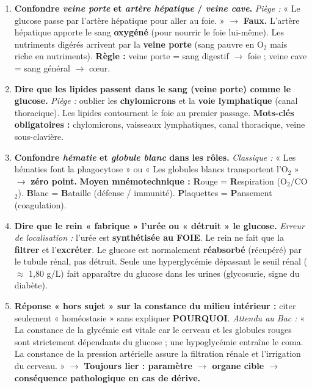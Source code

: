 \documentclass[11pt]{article}
\begin{document}
\begin{attention}
    \begin{enumerate}
        \item \textbf{Confondre \emph{veine porte} et \emph{artère hépatique} / \emph{veine cave}.}
            \emph{Piège :} « Le glucose passe par l'artère hépatique pour aller au foie. » $\rightarrow$ \textbf{Faux.} L'artère hépatique apporte le sang \textbf{oxygéné} (pour nourrir le foie lui-même). Les nutriments digérés arrivent par la \textbf{veine porte} (sang pauvre en O$_2$ mais riche en nutriments). \textbf{Règle :} veine porte = sang digestif $\rightarrow$ foie ; veine cave = sang général $\rightarrow$ cœur.
        \item \textbf{Dire que les lipides passent dans le sang (veine porte) comme le glucose.}
            \emph{Piège :} oublier les \textbf{chylomicrons} et la \textbf{voie lymphatique} (canal thoracique). Les lipides contournent le foie au premier passage. \textbf{Mots-clés obligatoires :} chylomicrons, vaisseaux lymphatiques, canal thoracique, veine sous-clavière.
        \item \textbf{Confondre \emph{hématie} et \emph{globule blanc} dans les rôles.}
            \emph{Classique :} « Les hématies font la phagocytose » ou « Les globules blancs transportent l'O$_2$ » $\rightarrow$ \textbf{zéro point.} \textbf{Moyen mnémotechnique :} \textbf{R}ouge = \textbf{R}espiration (O$_2$/CO$_2$). \textbf{B}lanc = \textbf{B}ataille (défense / immunité). \textbf{P}laquettes = \textbf{P}ansement (coagulation).
        \item \textbf{Dire que le rein « fabrique » l'urée ou « détruit » le glucose.}
            \emph{Erreur de localisation :} l'urée est \textbf{synthétisée au FOIE}. Le rein ne fait que la \textbf{filtrer} et l'\textbf{excréter}. Le glucose est normalement \textbf{réabsorbé} (récupéré) par le tubule rénal, pas détruit. Seule une hyperglycémie dépassant le seuil rénal ($\approx$ 1,80 g/L) fait apparaître du glucose dans les urines (glycosurie, signe du diabète).
        \item \textbf{Réponse « hors sujet » sur la constance du milieu intérieur :} citer seulement « homéostasie » sans expliquer \textbf{POURQUOI}.
            \emph{Attendu au Bac :} « La constance de la glycémie est vitale car le cerveau et les globules rouges sont strictement dépendants du glucose ; une hypoglycémie entraîne le coma. La constance de la pression artérielle assure la filtration rénale et l'irrigation du cerveau. » $\rightarrow$ \textbf{Toujours lier : paramètre $\rightarrow$ organe cible $\rightarrow$ conséquence pathologique en cas de dérive.}
    \end{enumerate}
\end{attention}
\end{document}
